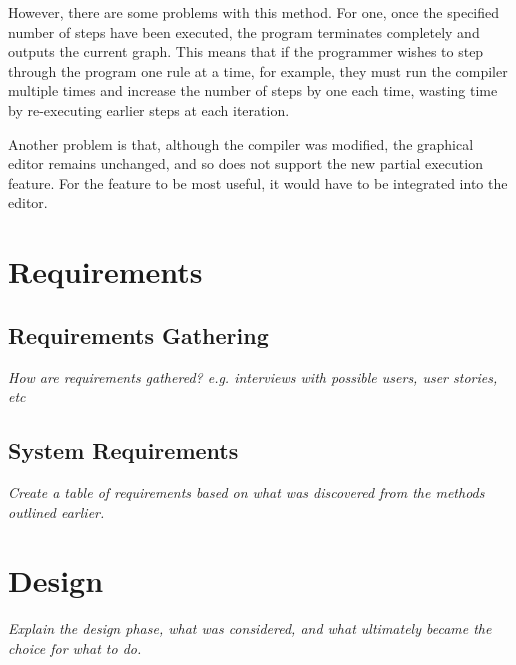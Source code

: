 \documentclass[authoryearcitations]{UoYCSproject}
\begin{document}
However, there are some problems with this method. For one, once the specified
number of steps have been executed, the program terminates completely and outputs
the current graph. This means that if the programmer wishes to step through the
program one rule at a time, for example, they must run the compiler multiple times
and increase the number of steps by one each time, wasting time by re-executing
earlier steps at each iteration.

Another problem is that, although the compiler was modified, the graphical editor
remains unchanged, and so does not support the new partial execution feature.
For the feature to be most useful, it would have to be integrated into the editor.


\clearpage


\chapter{Requirements}
\label{cha:Requirements}

\section{Requirements Gathering}
\label{sec:RequirementsGathering}

\emph{How are requirements gathered? e.g. interviews with possible users,
user stories, etc}


\section{System Requirements}
\label{sec:SystemRequirements}

\emph{Create a table of requirements based on what was discovered from the
methods outlined earlier.}

\clearpage


\chapter{Design}
\label{cha:Design}

\emph{Explain the design phase, what was considered, and what ultimately 
became the choice for what to do.}
\end{document}
